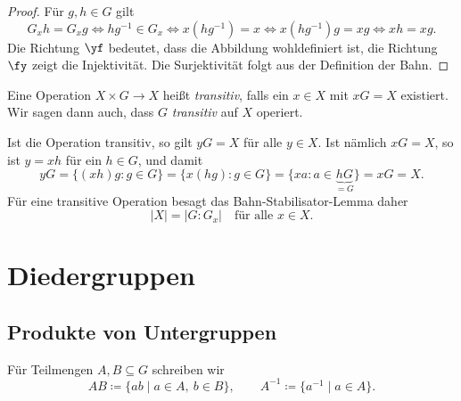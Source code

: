 \documentclass[11pt]{article}
\begin{document}
\begin{proof}
  Für $g, h \in G$ gilt
  \[ G_x h = G_x g \iff hg^{-1} \in G_x \iff x(hg^{-1}) = x \iff x(hg^{-1})g = xg \iff xh = xg. \]
  Die Richtung \glqq$\yf$\grqq{} bedeutet, dass die Abbildung wohldefiniert ist, die Richtung \glqq$\fy$\grqq{} zeigt die Injektivität. Die Surjektivität folgt aus der Definition der Bahn.
\end{proof}

\begin{definition}\Theorem
  Eine Operation $X \times G \to X$ heißt \emph{transitiv}, falls ein $x \in X$ mit $xG = X$ existiert. Wir sagen dann auch, dass $G$ \emph{transitiv} auf $X$ operiert.
\end{definition}

\begin{note}
  Ist die Operation transitiv, so gilt $yG = X$ für alle $y \in X$. Ist nämlich $xG = X$, so ist $y = xh$ für ein $h \in G$, und damit
  \[ yG = \{(xh)g : g \in G\} = \{x(hg) : g \in G\} = \{xa : a \in \underbrace{hG}_{= G}\} = xG = X. \]
  Für eine transitive Operation besagt das Bahn-Stabilisator-Lemma daher
  \[ \lvert X \rvert = \lvert G : G_x \rvert \quad \text{für alle } x \in X. \]
\end{note}


\section{Diedergruppen}

\subsection{Produkte von Untergruppen}

Für Teilmengen $A, B \subseteq G$ schreiben wir
\[ AB \coloneqq \{ab \mid a \in A,\ b \in B\}, \qquad A^{-1} \coloneqq \{a^{-1} \mid a \in A\}. \]
\end{document}
